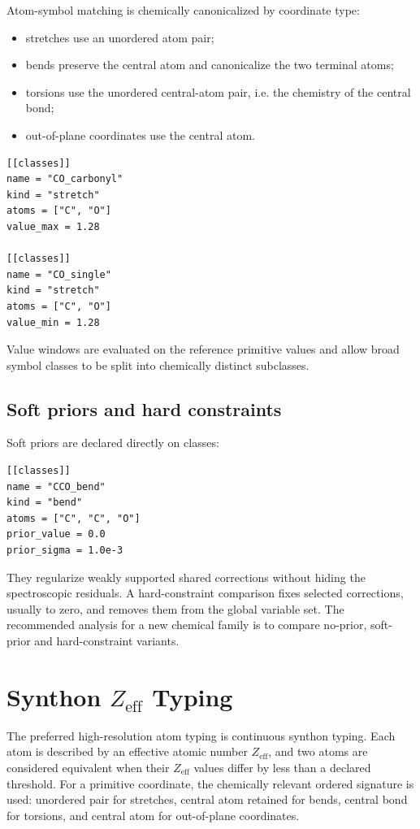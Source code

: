 \documentclass[11pt]{article}
\newcommand{\zeff}{Z_\mathrm{eff}}
\begin{document}
Atom-symbol matching is chemically canonicalized by coordinate type:

\begin{itemize}
  \item stretches use an unordered atom pair;
  \item bends preserve the central atom and canonicalize the two terminal atoms;
  \item torsions use the unordered central-atom pair, i.e. the chemistry of the
        central bond;
  \item out-of-plane coordinates use the central atom.
\end{itemize}

\begin{lstlisting}[style=merlino]
[[classes]]
name = "CO_carbonyl"
kind = "stretch"
atoms = ["C", "O"]
value_max = 1.28

[[classes]]
name = "CO_single"
kind = "stretch"
atoms = ["C", "O"]
value_min = 1.28
\end{lstlisting}

\noindent
Value windows are evaluated on the reference primitive values and allow broad
symbol classes to be split into chemically distinct subclasses.

\subsection{Soft priors and hard constraints}

Soft priors are declared directly on classes:

\begin{lstlisting}[style=merlino]
[[classes]]
name = "CCO_bend"
kind = "bend"
atoms = ["C", "C", "O"]
prior_value = 0.0
prior_sigma = 1.0e-3
\end{lstlisting}

\noindent
They regularize weakly supported shared corrections without hiding the
spectroscopic residuals.  A hard-constraint comparison fixes selected
corrections, usually to zero, and removes them from the global variable set.
The recommended analysis for a new chemical family is to compare no-prior,
soft-prior and hard-constraint variants.

\section{Synthon \texorpdfstring{\(Z_\mathrm{eff}\)}{Zeff} Typing}

The preferred high-resolution atom typing is continuous synthon typing.  Each
atom is described by an effective atomic number \(\zeff\), and two atoms are
considered equivalent when their \(\zeff\) values differ by less than a
declared threshold.  For a primitive coordinate, the chemically relevant
ordered signature is used: unordered pair for stretches, central atom retained
for bends, central bond for torsions, and central atom for out-of-plane
coordinates.
\end{document}
